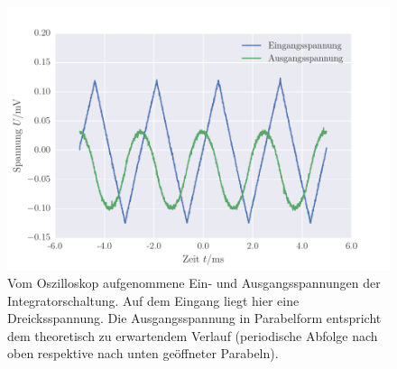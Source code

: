 \FloatBarrier
\begin{figure}[!h]
\centering
\includegraphics[scale=0.75]{../Grafiken/Integrator_Oszilloskop_Dreieck.pdf}
\caption{Vom Oszilloskop aufgenommene Ein- und Ausgangsspannungen der Integratorschaltung. Auf dem Eingang
	liegt hier eine Dreicksspannung. Die Ausgangsspannung in Parabelform entspricht dem theoretisch
	zu erwartendem Verlauf (periodische Abfolge nach oben respektive nach unten geöffneter 
	Parabeln).\label{fig:integrator_oszilloskop_dreieck}}
\end{figure}
\FloatBarrier